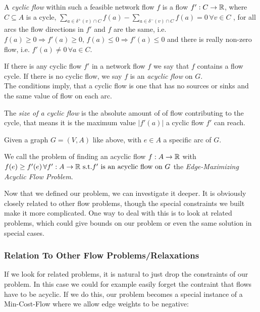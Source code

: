 \begin{definition}
A \textit{cyclic flow} within such a feasible network flow $f$ is a flow $f':C\to \mathbb{R}$, where $C\subseteq A$ is a cycle, 
$\sum_{a\in \delta^+(v)\cap C}f(a)-\sum_{a\in\delta^-(v)\cap C}f(a) = 0 \, \forall v\in C$ , for all arcs the flow 
directions in $f'$ and $f$ are the same, i.e. $f(a)\ge 0\Rightarrow f'(a)\ge 0,\, f(a)\le 0 \Rightarrow f'(a)\le 0$ and 
there is really non-zero flow, i.e. $f'(a) \ne 0 \,\forall a\in C$. 

If there is any cyclic flow $f'$ in a network flow $f$ we say that $f$ contains a flow cycle. If there is no cyclic 
flow, we say $f$ is an \textit{acyclic flow} on $G$.\\

The conditions imply, that a cyclic flow is one that has no sources or sinks and the same value of flow on each arc.

The \textit{size of a cyclic flow} is the absolute amount of of flow contributing to the cycle, that means it is the 
maximum value $|f'(a)|$ a cyclic flow $f'$ can reach. 
\end{definition}


\begin{definition}
  Given a graph $G=(V,A)$ like above, with $e \in A$ a specific arc of $G$. 
  
  We call the problem of finding an acyclic flow $f:A\to \mathbb{R}$ with $f(e)\ge f'(e)\,\forall f':A\to \mathbb{R} \textrm{ s.t.} f' 
\textrm{ is an acyclic flow on }G$ the \textit{ Edge-Maximizing Acyclic Flow Problem}.
\end{definition}

Now that we defined our problem, we can investigate it deeper. It is obviously closely related to other flow problems, 
though the special constraints we built make it more complicated. One way to deal with this is to look at related 
problems, which could give bounds on our problem or even the same solution in special cases.

\subsubsection{Relation To Other Flow Problems/Relaxations}

If we look for related problems, it is natural to just drop the constraints of our problem. In this case we could for 
example easily forget the contraint that flows have to be acyclic. If we do this, our problem becomes a special 
instance of a Min-Cost-Flow where we allow edge weights to be negative:

